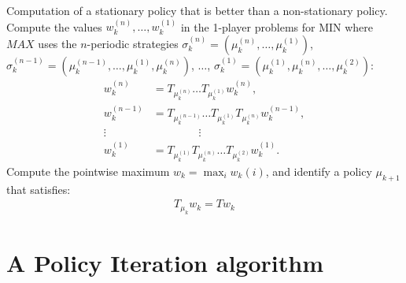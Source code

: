 \documentclass{article}
\begin{document}
Computation of a stationary policy that is better than a non-stationary policy.
Compute the values $w_k^{(n)},\dots,w_k^{(1)}$ in the 1-player problems for MIN where $MAX$ uses the $n$-periodic strategies $\sigma_k^{(n)} = (\mu_k^{(n)},\dots,\mu_k^{(1)})$, $\sigma_k^{(n-1)} = (\mu_k^{(n-1)},\dots,\mu_k^{(1)},\mu_k^{(n)})$, $\dots$, $\sigma_k^{(1)}=(\mu_k^{(1)},\mu_k^{(n)},\dots,\mu_k^{(2)})$:
\begin{align}
  w_k^{(n)} &= T_{\mu_k^{(n)}} \dots T_{\mu_k^{(1)}} w_k^{(n)}, \\
  w_k^{(n-1)} &= T_{\mu_k^{(n-1)}} \dots T_{\mu_k^{(1)}} T_{\mu_k^{(n)}} w_k^{(n-1)}, \\
  \vdots ~~~~ & ~~~~~~~~~~~~~~~~~~~ \vdots \\
  w_k^{(1)} &= T_{\mu_k^{(1)}} T_{\mu_k^{(n)}} \dots T_{\mu_k^{(2)}}  w_k^{(1)}.
\end{align}
Compute the pointwise maximum $w_k=\max_{i}w_k{(i)}$, and 
identify a policy $\mu_{k+1}$ that satisfies:
\begin{align}
  T_{\mu_k} w_k = T w_k
\end{align}


\section{A Policy Iteration algorithm}
\label{algo}
\end{document}
